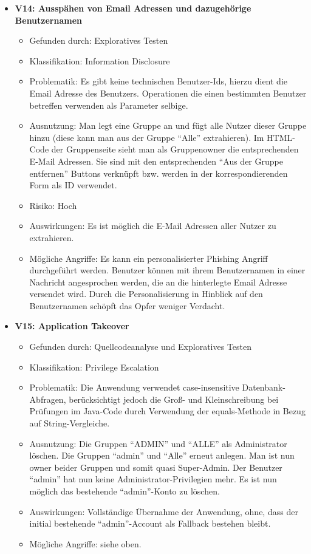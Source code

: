 \documentclass[12pt,DIV14,BCOR10mm,a4paper,parskip=half-,headsepline,headinclude,english,ngerman,bibliography=totocnumbered]{scrreprt}
\begin{document}
\begin{itemize}
  \hypertarget{vulnerability14}{}
  \item \textbf{V14: Ausspähen von Email Adressen und dazugehörige Benutzernamen}
  \begin{itemize}
  \item Gefunden durch: Exploratives Testen
  \item Klassifikation: Information Disclosure
  \item Problematik: Es gibt keine technischen Benutzer-Ids, hierzu dient die Email Adresse des Benutzers. Operationen die einen bestimmten Benutzer betreffen verwenden als Parameter selbige.
  \item Ausnutzung: Man legt eine Gruppe an und fügt alle Nutzer dieser Gruppe hinzu (diese kann man aus der Gruppe \enquote{Alle} extrahieren). Im HTML-Code der Gruppenseite sieht man als Gruppenowner die entsprechenden E-Mail Adressen. Sie sind mit den entsprechenden \enquote{Aus der Gruppe entfernen} Buttons verknüpft bzw. werden in der korrespondierenden Form als ID verwendet.
  \item Risiko: Hoch
  \item Auswirkungen: Es ist möglich die E-Mail Adressen aller Nutzer zu extrahieren.
  \item Mögliche Angriffe: Es kann ein personalisierter Phishing Angriff durchgeführt werden. Benutzer können mit ihrem Benutzernamen in einer Nachricht angesprochen werden, die an die hinterlegte Email Adresse versendet wird. Durch die Personalisierung in Hinblick auf den Benutzernamen schöpft das Opfer weniger Verdacht.
  \end{itemize}

  \hypertarget{vulnerability15}{}
  \item \textbf{V15: Application Takeover}
  \begin{itemize}
  \item Gefunden durch: Quellcodeanalyse und Exploratives Testen
  \item Klassifikation: Privilege Escalation
  \item Problematik: Die Anwendung verwendet case-insensitive Datenbank-Abfragen, berücksichtigt jedoch die Groß- und Kleinschreibung bei Prüfungen im Java-Code durch Verwendung der equals-Methode in Bezug auf String-Vergleiche.
  \item Ausnutzung: Die Gruppen \enquote{ADMIN} und \enquote{ALLE} als Administrator löschen. Die Gruppen \enquote{admin} und \enquote{Alle} erneut anlegen. Man ist nun owner beider Gruppen und somit quasi Super-Admin. Der Benutzer \enquote{admin} hat nun keine Administrator-Privilegien mehr. Es ist nun möglich das bestehende \enquote{admin}-Konto zu löschen.
  \item Auswirkungen: Vollständige Übernahme der Anwendung, ohne, dass der initial bestehende \enquote{admin}-Account als Fallback bestehen bleibt.
  \item Mögliche Angriffe: siehe oben.
  \end{itemize}
\end{itemize}
\end{document}
